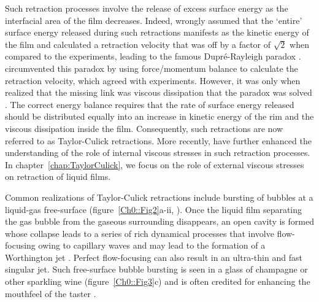 Such retraction processes involve the release of excess surface energy as the interfacial area of the film decreases. Indeed, \citet{dupre1867theorie, dupre1869theorie} wrongly assumed that the \lq entire\rq\, surface energy released during such retractions manifests as the kinetic energy of the film \citep{rayleigh-1891-nature} and calculated a retraction velocity that was off by a factor of $\sqrt{2}$ when compared to the experiments, leading to the famous Dupr{\'e}-Rayleigh paradox \citep{villermaux2020fragmentation}. \citet{taylor-1959-procrsoclonda} circumvented this paradox by using force/momentum balance to calculate the retraction velocity, which agreed with experiments. However, it was only when \citet{culick-1960-japplphys} realized that the missing link was viscous dissipation that the paradox was solved \citep{de1996introductory}. The correct energy balance requires that the rate of surface energy released should be distributed equally into an increase in kinetic energy of the rim and the viscous dissipation inside the film. Consequently, such retractions are now referred to as Taylor-Culick retractions. More recently, \citet{savva-2009-jfm, pierson2020revisiting, deka2020revisiting} have further enhanced the understanding of the role of internal viscous stresses in such retraction processes. In chapter~\ref{chap:TaylorCulick}, we focus on the role of external viscous stresses on  retraction of liquid films. 

Common realizations of Taylor-Culick retractions include bursting of bubbles at a liquid-gas free-surface (figure~\ref{Ch0::Fig2}a-ii, \citep{lhuissier2012bursting}). Once the liquid film separating the gas bubble from the gaseous surrounding disappears, an open cavity is formed \citep{mason1954bursting} whose collapse leads to a series of rich dynamical processes that involve flow-focusing owing to capillary waves \citep{zeff2000singularity, duchemin2002jet} and may lead to the formation of a Worthington jet \citep{gordillo2019capillary}. Perfect flow-focusing can also result in an ultra-thin and fast singular jet. Such free-surface bubble bursting is seen in a glass of champagne or other sparkling wine (figure~\ref{Ch0::Fig3}c) and is often credited for enhancing the mouthfeel of the taster \citep{liger2012physics,vignes2013fizzling,ghabache2014physics,ghabache2016evaporation}.

